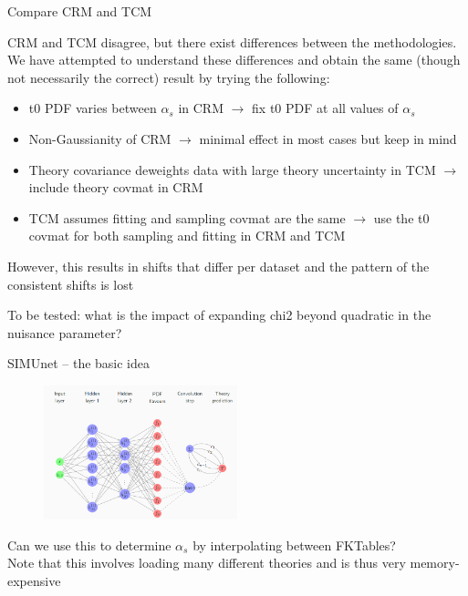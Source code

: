 \documentclass[aspectratio=169, 8pt,t]{beamer}
\begin{document}
\begin{frame}{Compare CRM and TCM}

  CRM and TCM disagree, but there exist differences between the methodologies. We have attempted to understand these differences and obtain the same (though not necessarily the correct) result by trying the following:
  \begin{itemize}
    \item t0 PDF varies between $\alpha_s$ in CRM $\rightarrow$ fix t0 PDF at all values of $\alpha_s$
    \item Non-Gaussianity of CRM $\rightarrow$ minimal effect in most cases but keep in mind
    \item Theory covariance deweights data with large theory uncertainty in TCM $\rightarrow$ include theory covmat in CRM
    \item TCM assumes fitting and sampling covmat are the same $\rightarrow$ use the t0 covmat for both sampling and fitting in CRM and TCM
  \end{itemize}

  \vspace*{1em}

  However, this results in shifts that differ per dataset and the pattern of the consistent shifts is lost

  \vspace*{1em}

  To be tested: what is the impact of expanding chi2 beyond quadratic in the nuisance parameter?

\end{frame}

\begin{frame}{SIMUnet -- the basic idea}
  \begin{figure}
    \includegraphics[width=0.5\textwidth]{figures/simunet_schematic.png}
  \end{figure}
  Can we use this to determine $\alpha_s$ by interpolating between FKTables?\\
  Note that this involves loading many different theories and is thus very memory-expensive
\end{frame}
\end{document}
